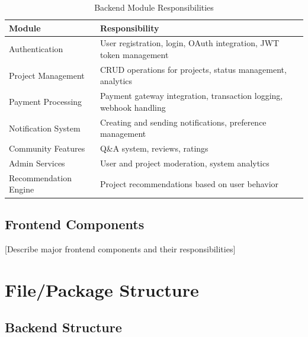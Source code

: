 \documentclass[a4paper,12pt]{report}
\begin{document}
\begin{table}[H]
\centering
\small
\begin{tabular}{|p{4cm}|p{9cm}|}
\hline
\textbf{Module} & \textbf{Responsibility} \\
\hline
Authentication & User registration, login, OAuth integration, JWT token management \\
\hline
Project Management & CRUD operations for projects, status management, analytics \\
\hline
Payment Processing & Payment gateway integration, transaction logging, webhook handling \\
\hline
Notification System & Creating and sending notifications, preference management \\
\hline
Community Features & Q\&A system, reviews, ratings \\
\hline
Admin Services & User and project moderation, system analytics \\
\hline
Recommendation Engine & Project recommendations based on user behavior \\
\hline
\end{tabular}
\caption{Backend Module Responsibilities}
\label{tab:backend-modules}
\end{table}

\subsection{Frontend Components}

[Describe major frontend components and their responsibilities]

\section{File/Package Structure}

\subsection{Backend Structure}
\end{document}
